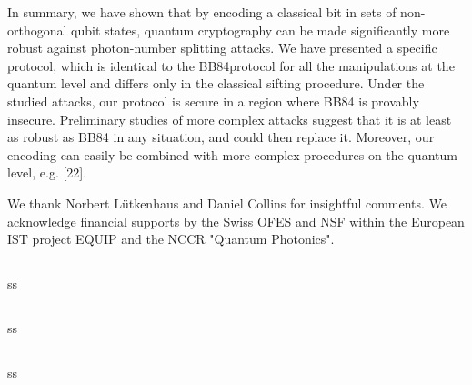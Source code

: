In summary, we have shown that by encoding a classical bit in sets of non-orthogonal qubit states, quantum cryptography can be made significantly more robust against photon-number splitting attacks. We have presented a specific protocol, which is identical to the BB84protocol for all the manipulations at the quantum level and differs only in the classical sifting procedure. Under the studied attacks, our protocol is secure in a region where BB84 is provably insecure. Preliminary studies of more complex attacks suggest that it is at least as robust as BB84 in any situation, and could then replace it. Moreover, our encoding can easily be combined with more complex procedures on the quantum level, e.g. [22].

We thank Norbert Lütkenhaus and Daniel Collins for insightful comments. We acknowledge financial supports by the Swiss OFES and NSF within the European IST project EQUIP and the NCCR "Quantum Photonics".


\subsection{\trnas}
ss
\subsection{\review}
ss
\subsection{\dic}
ss